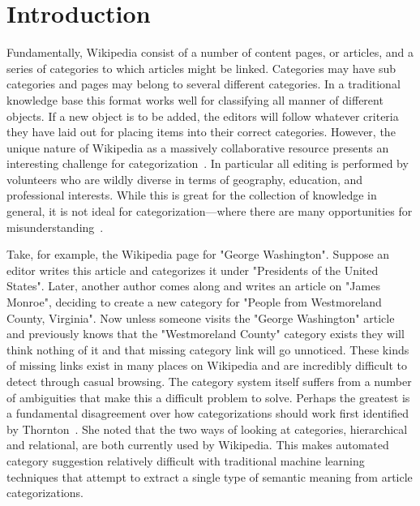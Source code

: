 \documentclass{sig-alternate}
\begin{document}
\section{Introduction}
\label{sec:intro}
Fundamentally, Wikipedia consist of a number of content pages, or articles, and a series of categories to which articles might be linked. Categories may have sub categories and pages may belong to several different categories. In a traditional knowledge base this format works well for classifying all manner of different objects. If a new object is to be added, the editors will follow whatever criteria they have laid out for placing items into their correct categories. However, the unique nature of Wikipedia as a massively collaborative resource presents an interesting challenge for categorization~\cite{Richardson}. In particular all editing is performed by volunteers who are wildly diverse in terms of geography, education, and professional interests. While this is great for the collection of knowledge in general, it is not ideal for categorization---where there are many opportunities for misunderstanding~\cite{McDonald}.

Take, for example, the Wikipedia page for "George Washington". Suppose an editor writes this article and categorizes it under "Presidents of the United States". Later, another author comes along and writes an article on "James Monroe", deciding to create a new category for "People from Westmoreland County, Virginia". Now unless someone visits the "George Washington" article and previously knows that the "Westmoreland County" category exists they will think nothing of it and that missing category link will go unnoticed. These kinds of missing links exist in many places on Wikipedia and are incredibly difficult to detect through casual browsing. The category system itself suffers from a number of ambiguities that make this a difficult problem to solve. Perhaps the greatest is a fundamental disagreement over how categorizations should work first identified by Thornton~\cite{Thornton}. She noted that the two ways of looking at categories, hierarchical and relational, are both currently used by Wikipedia. This makes automated category suggestion relatively difficult with traditional machine learning techniques that attempt to extract a single type of semantic meaning from article categorizations.
\end{document}
